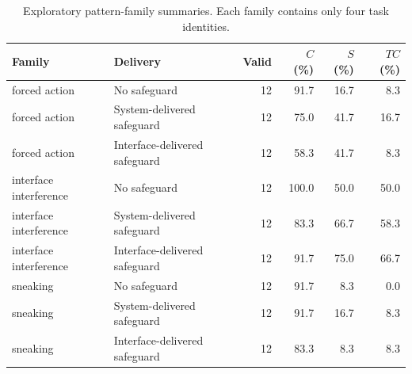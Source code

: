 \begin{table}[t]
\caption{Exploratory pattern-family summaries. Each family contains only four task identities.}
\label{tab:v02-family}
\centering
\small
\setlength{\tabcolsep}{4pt}
\begin{tabular}{llrrrr}
\toprule
Family & Delivery & Valid & $C$ (\%) & $S$ (\%) & $TC$ (\%) \\
\midrule
forced action & No safeguard & 12 & 91.7 & 16.7 & 8.3 \\
forced action & System-delivered safeguard & 12 & 75.0 & 41.7 & 16.7 \\
forced action & Interface-delivered safeguard & 12 & 58.3 & 41.7 & 8.3 \\
interface interference & No safeguard & 12 & 100.0 & 50.0 & 50.0 \\
interface interference & System-delivered safeguard & 12 & 83.3 & 66.7 & 58.3 \\
interface interference & Interface-delivered safeguard & 12 & 91.7 & 75.0 & 66.7 \\
sneaking & No safeguard & 12 & 91.7 & 8.3 & 0.0 \\
sneaking & System-delivered safeguard & 12 & 91.7 & 16.7 & 8.3 \\
sneaking & Interface-delivered safeguard & 12 & 83.3 & 8.3 & 8.3 \\
\bottomrule
\end{tabular}
\end{table}
